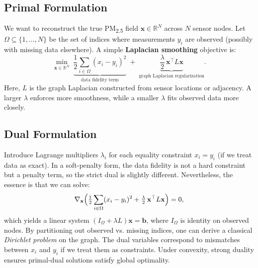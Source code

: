 \documentclass[12pt]{article}                                %
\begin{document}
\subsection{Primal Formulation}  %
We want to reconstruct the true PM\textsubscript{2.5} field $\mathbf{x}\in\mathbb{R}^N$ across 
$N$ sensor nodes. Let $\Omega \subseteq \{1,\dots,N\}$ be the set of indices where measurements 
$y_i$ are observed (possibly with missing data elsewhere). A simple \textbf{Laplacian smoothing} 
objective is:
\begin{equation}
\label{eq:primal}
\min_{\mathbf{x}\in\mathbb{R}^N} \; 
\underbrace{\frac{1}{2}\sum_{i\in \Omega}(x_i - y_i)^2}_{\text{data fidelity term}} 
\;+\; \underbrace{\frac{\lambda}{2}\, \mathbf{x}^\top L \mathbf{x}}_{\text{graph Laplacian regularization}}.
\end{equation}
Here, $L$ is the graph Laplacian constructed from sensor locations or adjacency. A larger $\lambda$ 
enforces more smoothness, while a smaller $\lambda$ fits observed data more closely.

\subsection{Dual Formulation}   %
Introduce Lagrange multipliers $\lambda_i$ for each equality constraint $x_i = y_i$ (if we treat 
data as exact). In a soft-penalty form, the data fidelity is not a hard constraint but a penalty 
term, so the strict dual is slightly different. Nevertheless, the essence is that we can solve:
\begin{equation}
\nabla_{\mathbf{x}} \Bigl(\tfrac12\sum_{i\in \Omega}(x_i-y_i)^2 + 
\tfrac{\lambda}{2}\,\mathbf{x}^\top L \mathbf{x}\Bigr) = 0,
\end{equation}
which yields a linear system $(I_\Omega + \lambda L)\mathbf{x} = \mathbf{b}$, where $I_\Omega$ 
is identity on observed nodes. By partitioning out observed vs. missing indices, one can derive 
a classical \emph{Dirichlet problem} on the graph. The dual variables correspond to mismatches 
between $x_i$ and $y_i$ if we treat them as constraints. Under convexity, strong duality ensures 
primal-dual solutions satisfy global optimality.
\end{document}
